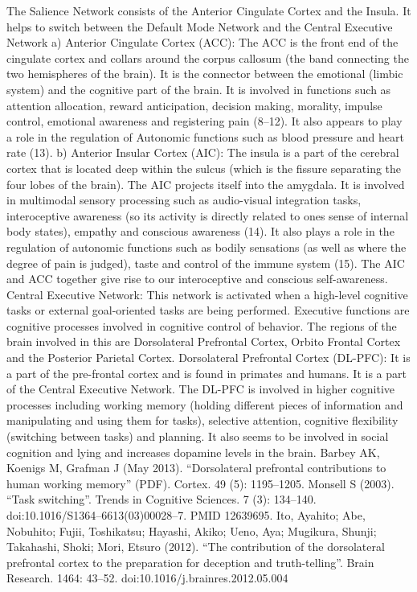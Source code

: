 \documentclass{article}
\begin{document}
The Salience Network consists of the Anterior Cingulate Cortex and the Insula. It helps to switch between the Default Mode Network and the Central Executive Network
a) Anterior Cingulate Cortex (ACC): The ACC is the front end of the cingulate cortex and collars around the corpus callosum (the band connecting the two hemispheres of the brain). It is the connector between the emotional (limbic system) and the cognitive part of the brain. It is involved in functions such as attention allocation, reward anticipation, decision making, morality, impulse control, emotional awareness and registering pain (8–12). It also appears to play a role in the regulation of Autonomic functions such as blood pressure and heart rate (13).
b) Anterior Insular Cortex (AIC): The insula is a part of the cerebral cortex that is located deep within the sulcus (which is the fissure separating the four lobes of the brain). The AIC projects itself into the amygdala. It is involved in multimodal sensory processing such as audio-visual integration tasks, interoceptive awareness (so its activity is directly related to ones sense of internal body states), empathy and conscious awareness (14). It also plays a role in the regulation of autonomic functions such as bodily sensations (as well as where the degree of pain is judged), taste and control of the immune system (15).
The AIC and ACC together give rise to our interoceptive and conscious self-awareness.
Central Executive Network:
This network is activated when a high-level cognitive tasks or external goal-oriented tasks are being performed. Executive functions are cognitive processes involved in cognitive control of behavior.
The regions of the brain involved in this are Dorsolateral Prefrontal Cortex, Orbito Frontal Cortex and the Posterior Parietal Cortex.
Dorsolateral Prefrontal Cortex (DL-PFC): It is a part of the pre-frontal cortex and is found in primates and humans. It is a part of the Central Executive Network. The DL-PFC is involved in higher cognitive processes including working memory (holding different pieces of information and manipulating and using them for tasks), selective attention, cognitive flexibility (switching between tasks) and planning. It also seems to be involved in social cognition and lying and increases dopamine levels in the brain.
Barbey AK, Koenigs M, Grafman J (May 2013). “Dorsolateral prefrontal contributions to human working memory” (PDF). Cortex. 49 (5): 1195–1205.
Monsell S (2003). “Task switching”. Trends in Cognitive Sciences. 7 (3): 134–140. doi:10.1016/S1364–6613(03)00028–7. PMID 12639695.
Ito, Ayahito; Abe, Nobuhito; Fujii, Toshikatsu; Hayashi, Akiko; Ueno, Aya; Mugikura, Shunji; Takahashi, Shoki; Mori, Etsuro (2012). “The contribution of the dorsolateral prefrontal cortex to the preparation for deception and truth-telling”. Brain Research. 1464: 43–52. doi:10.1016/j.brainres.2012.05.004
\end{document}
